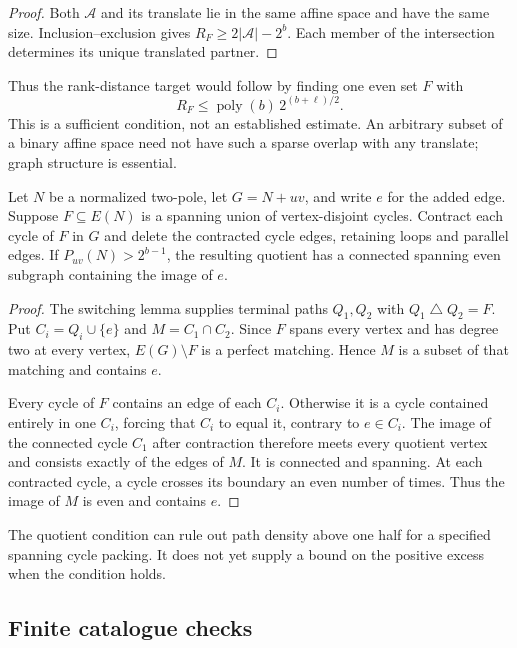 \begin{proof}
Both $\mathcal A$ and its translate lie in the same affine space and have the same size.
Inclusion--exclusion gives $R_F\ge2|\mathcal A|-2^b$.
Each member of the intersection determines its unique translated partner.
\end{proof}

Thus the rank-distance target would follow by finding one even set $F$ with
\[
 R_F\le\operatorname{poly}(b)\,2^{(b+\ell)/2}.
\]
This is a sufficient condition, not an established estimate.
An arbitrary subset of a binary affine space need not have such a sparse overlap with any translate; graph structure is essential.

\begin{proposition}
\label{prop:path-factor-threading}
Let $N$ be a normalized two-pole, let $G=N+uv$, and write $e$ for the added edge.
Suppose $F\subseteq E(N)$ is a spanning union of vertex-disjoint cycles.
Contract each cycle of $F$ in $G$ and delete the contracted cycle edges, retaining loops and parallel edges.
If $P_{uv}(N)>2^{b-1}$, the resulting quotient has a connected spanning even subgraph containing the image of $e$.
\end{proposition}

\begin{proof}
The switching lemma supplies terminal paths $Q_1,Q_2$ with $Q_1\mathbin\triangle Q_2=F$.
Put $C_i=Q_i\cup\{e\}$ and $M=C_1\cap C_2$.
Since $F$ spans every vertex and has degree two at every vertex, $E(G)\setminus F$ is a perfect matching.
Hence $M$ is a subset of that matching and contains $e$.

Every cycle of $F$ contains an edge of each $C_i$.
Otherwise it is a cycle contained entirely in one $C_i$, forcing that $C_i$ to equal it, contrary to $e\in C_i$.
The image of the connected cycle $C_1$ after contraction therefore meets every quotient vertex and consists exactly of the edges of $M$.
It is connected and spanning.
At each contracted cycle, a cycle crosses its boundary an even number of times.
Thus the image of $M$ is even and contains $e$.
\end{proof}

The quotient condition can rule out path density above one half for a specified spanning cycle packing.
It does not yet supply a bound on the positive excess when the condition holds.

\subsection{Finite catalogue checks}

